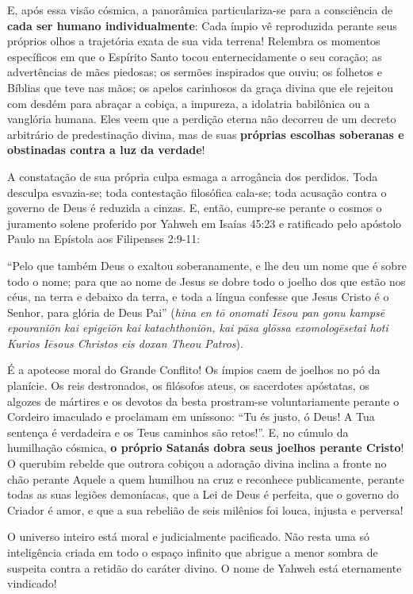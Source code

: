 E, após essa visão cósmica, a panorâmica particulariza-se para a consciência de \textbf{cada ser humano individualmente}:
Cada ímpio vê reproduzida perante seus próprios olhos a trajetória exata de sua vida terrena! Relembra os momentos específicos em que o Espírito Santo tocou enternecidamente o seu coração; as advertências de mães piedosas; os sermões inspirados que ouviu; os folhetos e Bíblias que teve nas mãos; os apelos carinhosos da graça divina que ele rejeitou com desdém para abraçar a cobiça, a impureza, a idolatria babilônica ou a vanglória humana.
Eles veem que a perdição eterna não decorreu de um decreto arbitrário de predestinação divina, mas de suas \textbf{próprias escolhas soberanas e obstinadas contra a luz da verdade}!

A constatação de sua própria culpa esmaga a arrogância dos perdidos. Toda desculpa esvazia-se; toda contestação filosófica cala-se; toda acusação contra o governo de Deus é reduzida a cinzas.
E, então, cumpre-se perante o cosmos o juramento solene proferido por Yahweh em Isaías 45:23 e ratificado pelo apóstolo Paulo na Epístola aos Filipenses 2:9-11:

``Pelo que também Deus o exaltou soberanamente, e lhe deu um nome que é sobre todo o nome; para que ao nome de Jesus se dobre todo o joelho dos que estão nos céus, na terra e debaixo da terra, e toda a língua confesse que Jesus Cristo é o Senhor, para glória de Deus Pai'' (\textit{hina en tō onomati Iēsou pan gonu kampsē epouraniōn kai epigeiōn kai katachthoniōn, kai pāsa glōssa exomologēsetai hoti Kurios Iēsous Christos eis doxan Theou Patros}).

É a apoteose moral do Grande Conflito!
Os ímpios caem de joelhos no pó da planície. Os reis destronados, os filósofos ateus, os sacerdotes apóstatas, os algozes de mártires e os devotos da besta prostram-se voluntariamente perante o Cordeiro imaculado e proclamam em uníssono: ``Tu és justo, ó Deus! A Tua sentença é verdadeira e os Teus caminhos são retos!''.
E, no cúmulo da humilhação cósmica, \textbf{o próprio Satanás dobra seus joelhos perante Cristo}! O querubim rebelde que outrora cobiçou a adoração divina inclina a fronte no chão perante Aquele a quem humilhou na cruz e reconhece publicamente, perante todas as suas legiões demoníacas, que a Lei de Deus é perfeita, que o governo do Criador é amor, e que a sua rebelião de seis milênios foi louca, injusta e perversa!

O universo inteiro está moral e judicialmente pacificado. Não resta uma só inteligência criada em todo o espaço infinito que abrigue a menor sombra de suspeita contra a retidão do caráter divino. O nome de Yahweh está eternamente vindicado!



